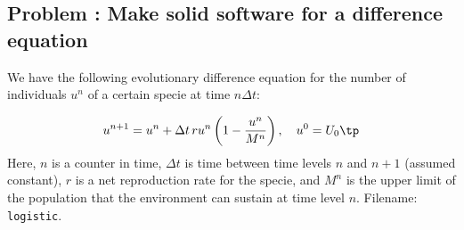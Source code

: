 \documentclass[graybox,sectrefs,envcountresetchap,open=right,final]{svmonodo}
\newenvironment{doconceexercise}{}{}
\newcounter{doconceexercisecounter}
\begin{document}
\begin{doconceexercise}

\subsection*{Problem \thedoconceexercisecounter: Make solid software for a difference equation}

\label{softeng1:exer:logistic}

We have the following evolutionary difference equation for the number
of individuals $u^n$ of a certain specie at time $n\Delta t$:

\begin{equation}
u^{n+1} = u^n + \Delta t\, r u^n\left(1 - \frac{u^n}{M^n}\right),
\quad u^0=U_0\tp
\label{softeng1:exer:logistic:eq}
\end{equation}
Here, $n$ is a counter in time, $\Delta t$ is time between time levels
$n$ and $n+1$ (assumed constant), $r$ is a net reproduction rate
for the specie,
and $M^n$ is the upper limit of the population that the environment can
sustain at time level $n$.
\noindent Filename: \texttt{logistic}.

\end{doconceexercise}



\clearemptydoublepage
{}
\thispagestyle{empty}





\cleardoublepage{}  %
\printindex
\end{document}
